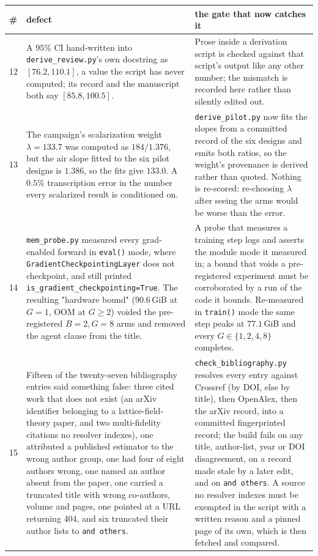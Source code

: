 \documentclass{article}
\begin{document}
\begin{table}[p]
\centering
\small\sloppy
\setlength{\tabcolsep}{4pt}
\begin{tabular}{@{}p{0.6cm}p{7.3cm}p{7.3cm}@{}}
\toprule
\# & defect & the gate that now catches it \\
\midrule
12 & A $95\%$ CI hand-written into \texttt{derive\_review.py}'s own docstring as $[76.2, 110.1]$, a value the script has never computed; its record and the manuscript both say $[85.8, 100.5]$. & Prose inside a derivation script is checked against that script's output like any other number; the mismatch is recorded here rather than silently edited out. \\
13 & The campaign's scalarization weight $\lambda = 133.7$ was computed as $184/1.376$, but the air slope fitted to the six pilot designs is $1.386$, so the fits give $133.0$. A $0.5\%$ transcription error in the number every scalarized result is conditioned on. & \texttt{derive\_pilot.py} now fits the slopes from a committed record of the six designs and emits both ratios, so the weight's provenance is derived rather than quoted. Nothing is re-scored: re-choosing $\lambda$ after seeing the arms would be worse than the error. \\
14 & \texttt{mem\_probe.py} measured every grad-enabled forward in \texttt{eval()} mode, where \texttt{GradientCheckpointingLayer} does not checkpoint, and still printed \texttt{is\_gradient\_checkpointing=True}. The resulting "hardware bound" ($90.6$\,GiB at $G=1$, OOM at $G\ge2$) voided the pre-registered $B=2,G=8$ arms and removed the agent clause from the title. & A probe that measures a training step logs and asserts the module mode it measured in; a bound that voids a pre-registered experiment must be corroborated by a run of the code it bounds. Re-measured in \texttt{train()} mode the same step peaks at $77.1$\,GiB and every $G\in\{1,2,4,8\}$ completes. \\
15 & Fifteen of the twenty-seven bibliography entries said something false: three cited work that does not exist (an arXiv identifier belonging to a lattice-field-theory paper, and two multi-fidelity citations no resolver indexes), one attributed a published estimator to the wrong author group, one had four of eight authors wrong, one named an author absent from the paper, one carried a truncated title with wrong co-authors, volume and pages, one pointed at a URL returning 404, and six truncated their author lists to \texttt{and others}. & \texttt{check\_bibliography.py} resolves every entry against Crossref (by DOI, else by title), then OpenAlex, then the arXiv record, into a committed fingerprinted record; the build fails on any title, author-list, year or DOI disagreement, on a record made stale by a later edit, and on \texttt{and others}.  A source no resolver indexes must be exempted in the script with a written reason and a pinned page of its own, which is then fetched and compared. \\

\end{tabular}
\end{table}
\end{document}
